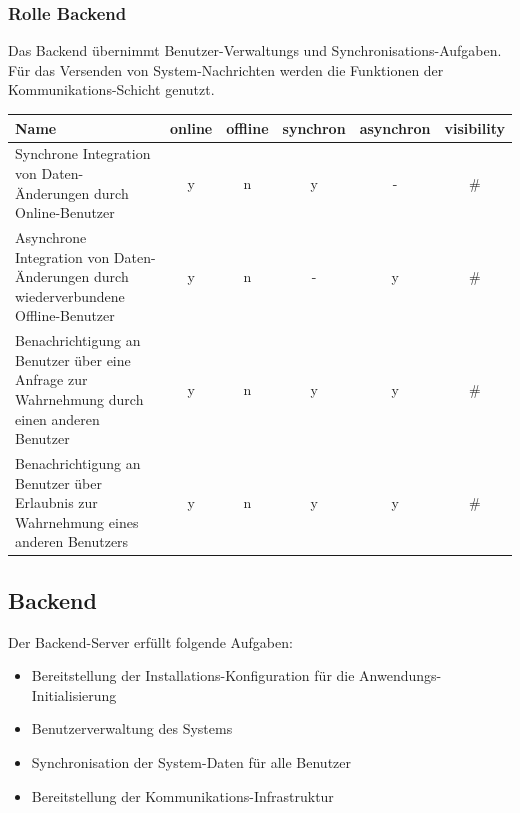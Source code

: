 \subsubsection{Rolle \textbf{Backend}}
Das Backend übernimmt Benutzer-Verwaltungs und Synchronisations-Aufgaben. Für das Versenden von System-Nachrichten werden die Funktionen der Kommunikations-Schicht genutzt.\\
	\begin{table}[H]
		\centering
		\begin{tabulary}{\columnwidth}{|L|C|C|C|C|C|}
		\hline
			\textbf{Name} & \textbf{online} & \textbf{offline} & \textbf{synchron} & \textbf{asynchron} & \textbf{visibility} \\ \hline
			Synchrone Integration von Daten-Änderungen durch Online-Benutzer & y & n & y & - & \# \\ \hline
			Asynchrone Integration von Daten-Änderungen durch wiederverbundene Offline-Benutzer & y & n & - & y & \# \\ \hline
			Benachrichtigung an Benutzer über eine Anfrage zur Wahrnehmung durch einen anderen Benutzer & y & n & y & y & \#  \\ \hline
			Benachrichtigung an Benutzer über Erlaubnis zur Wahrnehmung eines anderen Benutzers & y & n & y & y & \#  \\ \hline
		\end{tabulary}
	\end{table}

\subsection{Backend}\label{5_BE}
Der Backend-Server erfüllt folgende Aufgaben:
	\begin{itemize}
		\item Bereitstellung der Installations-Konfiguration für die Anwendungs-Initialisierung
		\item Benutzerverwaltung des Systems
		\item Synchronisation der System-Daten für alle Benutzer
		\item Bereitstellung der Kommunikations-Infrastruktur
	\end{itemize}

